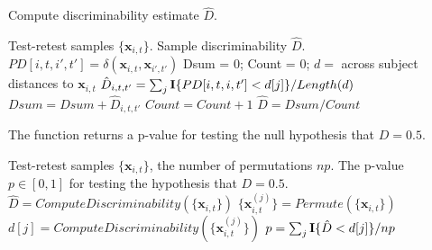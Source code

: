 \documentclass[simplex.tex]{subfiles}
\providecommand{\mb}[1]{\boldsymbol{#1}}
\newcommand{\bx}{\mb{x}}
\begin{document}
\begin{algorithm}               
	\caption{Compute discriminability estimate $\hat{D}$.  }   
	\label{alg:dhat}                       
	\begin{algorithmic}                    
		\Require Test-retest samples $\{\bx_{i,t}\}$.
		\Ensure Sample discriminability $\hat{D}$. 
		 
		\State $PD[i,t,i',t'] = \delta(\bx_{i,t},\bx_{i',t'})$
		\EndFor
		\State Dsum = 0;
		\State Count = 0;
		\State $d =$ across subject distances to $\bx_{i,t}$
		\State $\hat{D}_{i,t,t'} =\sum_j {\bf I}\{PD[i,t,i,t'] < d[j]\}/Length(d)$ 
		\State $Dsum = Dsum + \hat{D}_{i,t,t'}$
		\State $Count = Count + 1$
		\EndFor	
		\EndFor
		\EndFor
		\State $\hat{D} = Dsum / Count$ 
		\EndFunction
	\end{algorithmic}
\end{algorithm}

\begin{algorithm}               
	\caption{The function returns a p-value for testing the null hypothesis that $D = 0.5$.  }   
	\label{alg:ost}                       
	\begin{algorithmic}                    
		\Require Test-retest samples $\{\bx_{i,t}\}$, the number of permutations $np$.
		\Ensure The p-value $p \in [0,1]$ for testing the hypothesis that $D = 0.5$. 
		\State $\hat{D}= ComputeDiscriminability(\{\bx_{i,t}\})$ 
		\State $\{\bx^{(j)}_{i,t}\} = Permute(\{\bx_{i,t}\})$ 
		\State $d[j] = ComputeDiscriminability(\{\bx^{(j)}_{i,t}\})$ 
		\EndFor
		\State $p = \sum_j {\bf I}\{\hat{D} < d[j]\} / np$ 
		\EndFunction
	\end{algorithmic}
\end{algorithm}
\end{document}

